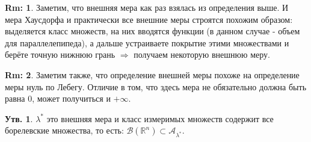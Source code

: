 \documentclass[12pt]{article}
\newcommand{\MR}{\mathbb{R}}
\newcommand{\MA}{\mathcal{A}}
\newcommand{\MB}{\mathcal{B}}
\theoremstyle{definition}
\newtheorem{rem}{Rm:}
\newtheorem{prop}{Утв.}
\begin{document}
\begin{rem}
	Заметим, что внешняя мера как раз взялась из определения выше. И мера Хаусдорфа и практически все внешние меры строятся похожим образом: выделяется класс множеств, на них вводятся функции (в данном случае - объем для параллелепипеда), а дальше устраиваете покрытие этими множествами и берёте точную нижнюю грань $\Rightarrow$ получаем некоторую внешнюю меру.
\end{rem}
\begin{rem}
	Заметим также, что определение внешней меры похоже на определение меры нуль по Лебегу. Отличие в том, что здесь мера не обязательно должна быть равна $0$, может получиться и $+\infty$.
\end{rem}
\begin{prop}
	$\lambda^*$ это внешняя мера и класс измеримых множеств содержит все борелевские множества, то есть: $\MB(\MR^n)\subset \MA_{\lambda^*}$.
\end{prop}
\end{document}
